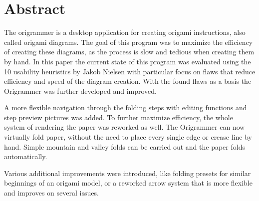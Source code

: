 
\section{Abstract}
\label{sec:abstract}

The \gls{origrammer} is a desktop application for creating origami instructions, also called origami \gls{diagram}s. The goal of this program was to maximize the efficiency of creating these diagrams, as the process is slow and tedious when creating them by hand.
In this paper the current state of this program was evaluated using the 10 usability heuristics by Jakob Nielsen \cite{10usability_heuristics} with particular focus on flaws that reduce efficiency and speed of the diagram creation. With the found flaws as a basis the Origrammer was further developed and improved.

A more flexible navigation through the folding steps with editing functions and step preview pictures was added. To further maximize efficiency, the whole system of rendering the paper was reworked as well. The Origrammer can now virtually fold paper, without the need to place every single edge or crease line by hand. Simple mountain and valley folds can be carried out and the paper folds automatically. %

Various additional improvements were introduced, like folding presets for similar beginnings of an origami model, or a reworked arrow system that is more flexible and improves on several issues.